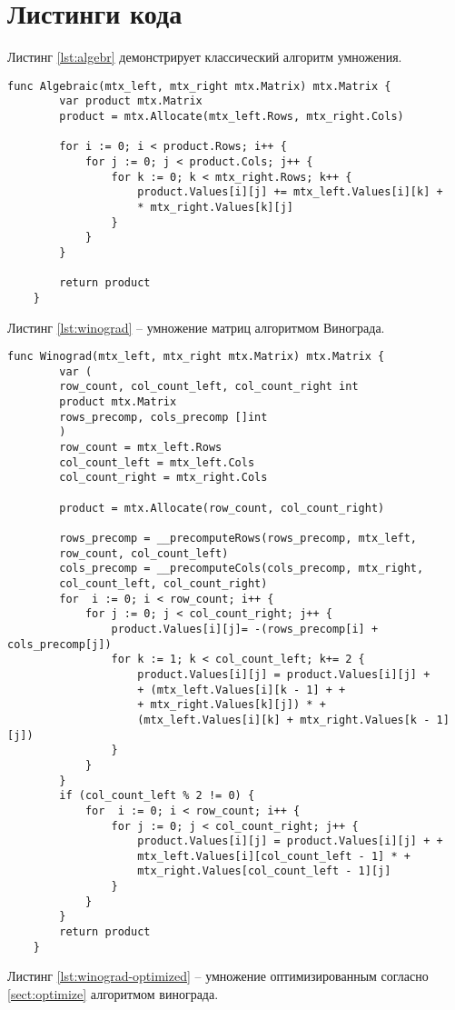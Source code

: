 \section{Листинги кода}
Листинг \ref{lst:algebr} демонстрирует классический алгоритм умножения. 
\captionsetup{singlelinecheck = false, justification=raggedright}
\begin{lstlisting}[label=lst:algebr,caption=Классический алгоритм умножения]
	func Algebraic(mtx_left, mtx_right mtx.Matrix) mtx.Matrix {
		var product mtx.Matrix
		product = mtx.Allocate(mtx_left.Rows, mtx_right.Cols)
		
		for i := 0; i < product.Rows; i++ {
			for j := 0; j < product.Cols; j++ {
				for k := 0; k < mtx_right.Rows; k++ {
					product.Values[i][j] += mtx_left.Values[i][k] +
					* mtx_right.Values[k][j]
				}
			}
		}
		
		return product
	}
\end{lstlisting}
Листинг \ref{lst:winograd} -- умножение матриц алгоритмом Винограда.
\begin{lstlisting}[label=lst:winograd,caption=Алгоритм умнложения Виноградом]
	func Winograd(mtx_left, mtx_right mtx.Matrix) mtx.Matrix {
		var (
		row_count, col_count_left, col_count_right int
		product mtx.Matrix
		rows_precomp, cols_precomp []int
		)
		row_count = mtx_left.Rows
		col_count_left = mtx_left.Cols
		col_count_right = mtx_right.Cols
		
		product = mtx.Allocate(row_count, col_count_right)
		
		rows_precomp = __precomputeRows(rows_precomp, mtx_left,
		row_count, col_count_left)
		cols_precomp = __precomputeCols(cols_precomp, mtx_right,
		col_count_left, col_count_right)
		for  i := 0; i < row_count; i++ {
			for j := 0; j < col_count_right; j++ {
				product.Values[i][j]= -(rows_precomp[i] + cols_precomp[j])
				for k := 1; k < col_count_left; k+= 2 {
					product.Values[i][j] = product.Values[i][j] +
					+ (mtx_left.Values[i][k - 1] + +
					+ mtx_right.Values[k][j]) * +
					(mtx_left.Values[i][k] + mtx_right.Values[k - 1][j])
				}
			}
		}
		if (col_count_left % 2 != 0) {
			for  i := 0; i < row_count; i++ {
				for j := 0; j < col_count_right; j++ {
					product.Values[i][j] = product.Values[i][j] + +
					mtx_left.Values[i][col_count_left - 1] * +
					mtx_right.Values[col_count_left - 1][j]
				}
			}
		}
		return product
	}
\end{lstlisting}	
Листинг \ref{lst:winograd-optimized} -- умножение оптимизированным согласно \ref{sect:optimize} алгоритмом винограда.
